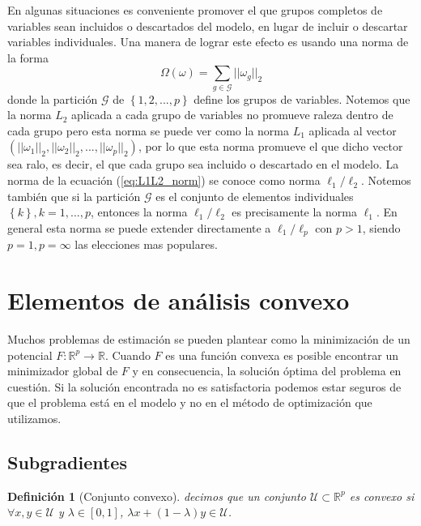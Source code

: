 \documentclass[12pt,draftcls, onecolumn, letterpaper,compsoc]{IEEEtran}
\newtheorem{definition}{\textbf{Definici\'{o}n}}
\begin{document}
En algunas situaciones es conveniente promover el que grupos completos de variables sean incluidos o descartados del modelo, en lugar de incluir o descartar variables individuales. Una manera de lograr este efecto es usando una norma de la forma
\begin{equation}\label{eq:L1L2_norm}
    \Omega(\omega) = \sum_{g\in\mathcal{G}}||\omega_g||_2
\end{equation}
donde la partici\'{o}n $\mathcal{G}$ de $\left\lbrace 1,2,...,p\right\rbrace$ define los grupos de variables. Notemos que la norma $L_2$ aplicada a cada grupo de variables no promueve raleza dentro de cada grupo pero esta norma se puede ver como la norma $L_1$ aplicada al vector $\left(||\omega_1||_2, ||\omega_2||_2, ..., ||\omega_p||_2\right)$, por lo que esta norma promueve el que dicho vector sea ralo, es decir, el que cada grupo sea incluido o descartado en el modelo. La norma de la ecuaci\'{o}n (\ref{eq:L1L2_norm}) se conoce como norma $\ell_1/\ell_2$. Notemos tambi\'{e}n que si la partici\'{o}n $\mathcal{G}$ es el conjunto de elementos individuales $\left\lbrace k\right\rbrace, k=1,...,p$, entonces la norma $\ell_1/\ell_2$ es precisamente la norma $\ell_1$. En general esta norma se puede extender directamente a $\ell_1/\ell_p$ con $p>1$, siendo $p=1, p=\infty$ las elecciones mas populares.

\section{Elementos de an\'{a}lisis convexo}
Muchos problemas de estimaci\'{o}n se pueden plantear como la minimizaci\'{o}n de un potencial $F:\mathbb{R}^{p} \rightarrow \mathbb{R}$. Cuando $F$ es una funci\'{o}n convexa es posible encontrar un minimizador global de $F$ y en consecuencia, la soluci\'{o}n \'{o}ptima del problema en cuesti\'{o}n. Si la soluci\'{o}n encontrada no es satisfactoria podemos estar seguros de que el problema est\'{a} en el modelo y no en el m\'{e}todo de optimizaci\'{o}n que utilizamos.\\

\subsection{Subgradientes}
\begin{definition}[Conjunto convexo]
decimos que un conjunto $\mathcal{U} \subset \mathbb{R}^{p}$ es {\it convexo} si $\forall x,y \in \mathcal{U}$ y $\lambda \in [0,1]$, $\lambda x + (1-\lambda)y \in \mathcal{U}$.\\
\end{definition}
\end{document}
